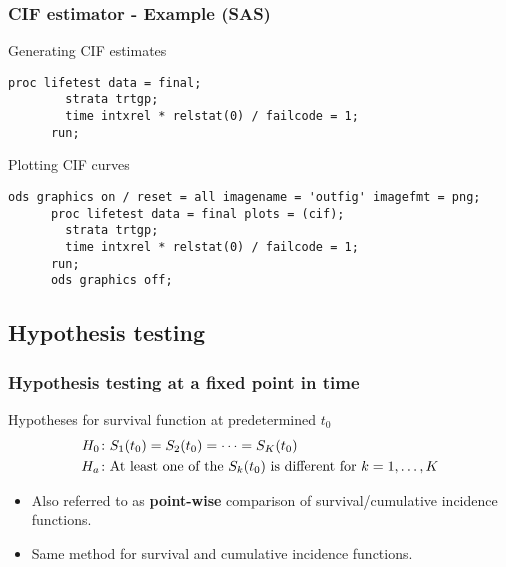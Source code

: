 \documentclass[11pt, aspectratio = 169]{beamer}
\begin{document}
\begin{frame}[fragile]
  \frametitle{CIF estimator - Example (SAS)}
  \begin{block}{Generating CIF estimates}
    \begin{lstlisting}[gobble = 6]
      proc lifetest data = final;
        strata trtgp;
        time intxrel * relstat(0) / failcode = 1;
      run;
    \end{lstlisting}
  \end{block}
  \begin{block}{Plotting CIF curves}
    \begin{lstlisting}[gobble = 6]
      ods graphics on / reset = all imagename = 'outfig' imagefmt = png;
      proc lifetest data = final plots = (cif);
        strata trtgp;
        time intxrel * relstat(0) / failcode = 1;
      run;
      ods graphics off;
    \end{lstlisting}
  \end{block}
\end{frame}

\subsection{Hypothesis testing}

\begin{frame}
  \frametitle{Hypothesis testing at a fixed point in time}
  \begin{block}{Hypotheses for survival function at predetermined $t_0$}
    \begin{equation*}
      \begin{split}
        H_0&\colon S_1(t_0) = S_2(t_0) = \dotsb = S_K(t_0) \\
        H_a&\colon \textnormal{At least one of the}\ S_k(t_0)\ \textnormal{is different for}\ k = 1,\dotsc,K
      \end{split}
    \end{equation*}
  \end{block}
  \begin{itemize}
    \item Also referred to as \textbf{point-wise} comparison of survival/cumulative incidence functions.
    \item Same method for survival and cumulative incidence functions.
  \end{itemize}
\end{frame}
\end{document}
